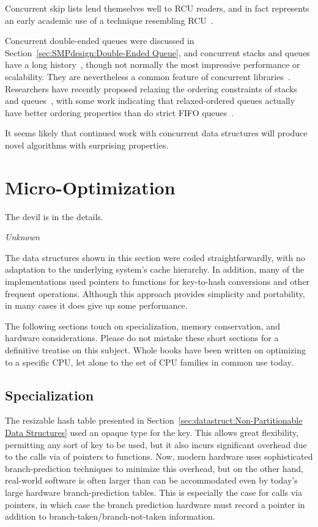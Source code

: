 Concurrent skip lists lend themselves well to RCU readers, and in fact
represents an early academic use of a technique resembling
RCU~\cite{Pugh90}.

Concurrent double-ended queues were discussed in
Section~\ref{sec:SMPdesign:Double-Ended Queue},
and concurrent stacks and queues have a long history~\cite{Treiber86},
though not normally the most impressive performance or scalability.
They are nevertheless a common feature of concurrent
libraries~\cite{PaulMcKenney2013LWNURCUqueuestack}.
Researchers have recently proposed relaxing the ordering constraints
of stacks and queues~\cite{Shavit:2011:DSM:1897852.1897873},
with some work indicating that relaxed-ordered queues actually have
better ordering properties than do strict FIFO
queues~\cite{AndreasHaas2012FIFOisnt,ChristophMKirsch2012FIFOisntTR,AndreasHaas2013CFRelaxedQueues}.

It seems likely that continued work with concurrent data structures will
produce novel algorithms with surprising properties.

\section{Micro-Optimization}
\label{sec:datastruct:Micro-Optimization}
%
\epigraph{The devil is in the details.}{\emph{Unknown}}

The data structures shown in this section were coded straightforwardly,
with no adaptation to the underlying system's cache hierarchy.
In addition, many of the implementations used pointers to functions
for key-to-hash conversions and other frequent operations.
Although this approach provides simplicity and portability, in many
cases it does give up some performance.

The following sections touch on specialization, memory conservation,
and hardware considerations.
Please do not mistake these short sections for a definitive treatise
on this subject.
Whole books have been written on optimizing to a specific CPU, let
alone to the set of CPU families in common use today.

\subsection{Specialization}
\label{sec:datastruct:Specialization}

The resizable hash table presented in
Section~\ref{sec:datastruct:Non-Partitionable Data Structures}
used an opaque type for the key.
This allows great flexibility, permitting any sort of key to be
used, but it also incurs significant overhead due to the calls via
of pointers to functions.
Now, modern hardware uses sophisticated branch-prediction techniques
to minimize this overhead, but on the other hand, real-world software
is often larger than can be accommodated even by today's large
hardware branch-prediction tables.
This is especially the case for calls via pointers, in which case
the branch prediction hardware must record a pointer in addition
to branch-taken/branch-not-taken information.

